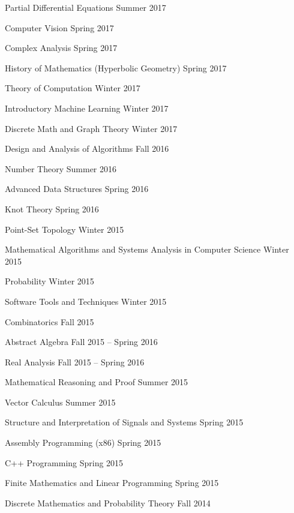 \documentclass[letterpaper,MMMyyyy,nonstopmode]{simpleresumecv}
\begin{document}
\begin{Body}
\BulletItem
Partial Differential Equations
\hfill Summer 2017

\BulletItem
Computer Vision
\hfill Spring 2017

\BulletItem
Complex Analysis
\hfill Spring 2017

\BulletItem
History of Mathematics (Hyperbolic Geometry)
\hfill Spring 2017

\BulletItem
Theory of Computation
\hfill Winter 2017

\BulletItem
Introductory Machine Learning
\hfill Winter 2017

\BulletItem
Discrete Math and Graph Theory
\hfill Winter 2017

\BulletItem
Design and Analysis of Algorithms
\hfill Fall 2016

\BigGap

\BulletItem
Number Theory
\hfill Summer 2016

\BulletItem
Advanced Data Structures
\hfill Spring 2016

\BulletItem
Knot Theory
\hfill Spring 2016

\BulletItem
Point-Set Topology
\hfill Winter 2015

\BulletItem
Mathematical Algorithms and Systems Analysis in Computer Science
\hfill Winter 2015

\BulletItem
Probability
\hfill Winter 2015

\BulletItem
Software Tools and Techniques
\hfill Winter 2015

\BulletItem
Combinatorics
\hfill Fall 2015

\BulletItem
Abstract Algebra
\hfill Fall 2015 -- Spring 2016

\BulletItem
Real Analysis
\hfill Fall 2015 -- Spring 2016

\BigGap

\BulletItem
Mathematical Reasoning and Proof
\hfill Summer 2015

\BulletItem
Vector Calculus
\hfill Summer 2015

\BulletItem
Structure and Interpretation of Signals and Systems
\hfill Spring 2015

\BulletItem
Assembly Programming (x86)
\hfill Spring 2015

\BulletItem
C++ Programming
\hfill Spring 2015

\BulletItem
Finite Mathematics and Linear Programming
\hfill Spring 2015

\BulletItem
Discrete Mathematics and Probability Theory
\hfill Fall 2014


\end{Body}
\end{document}
